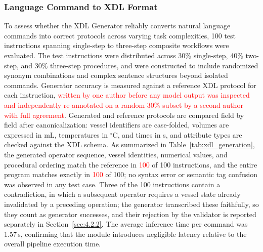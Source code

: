 \documentclass{ieeeaccess}
\newif\ifhighlight
\newcommand{\rev}[1]{\ifhighlight\hl{#1}\else#1\fi}
\newcommand{\nd}[1]{\textcolor{red}{#1}}
\begin{document}
\subsubsection{Language Command to XDL Format}\label{sec:4.2.1}
To assess whether the XDL Generator reliably converts natural language commands into \rev{correct} protocols across varying task complexities, 100 test instructions spanning single-step to three-step composite workflows were evaluated.
The test instructions were distributed across 30\% single-step, 40\% two-step, and 30\% three-step procedures, and were constructed to include randomized synonym combinations and complex sentence structures beyond isolated commands.
\rev{Generator accuracy is measured against a reference XDL protocol for each instruction, \nd{written by one author before any model output was inspected and independently re-annotated on a random 30\% subset by a second author with full agreement}.
Generated and reference protocols are compared field by field after canonicalization: vessel identifiers are case-folded, volumes are expressed in mL, temperatures in $^\circ$C, and times in s, and attribute types are checked against the XDL schema.
As summarized in Table~\ref{tab:xdl_generation}, the generated operator sequence, vessel identities, numerical values, and procedural ordering match the reference in \nd{100} of 100 instructions, and the entire program matches exactly in \nd{100} of 100; no syntax error or semantic tag confusion was observed in any test case.
Three of the 100 instructions contain a contradiction, in which a subsequent operator requires a vessel state already invalidated by a preceding operation; the generator transcribed these faithfully, so they count as generator successes, and their rejection by the validator is reported separately in Section~\ref{sec:4.2.2}.}
The average inference time per command was 1.57\rev{\,s}, confirming that the module introduces negligible latency relative to the overall pipeline execution time.
\end{document}
